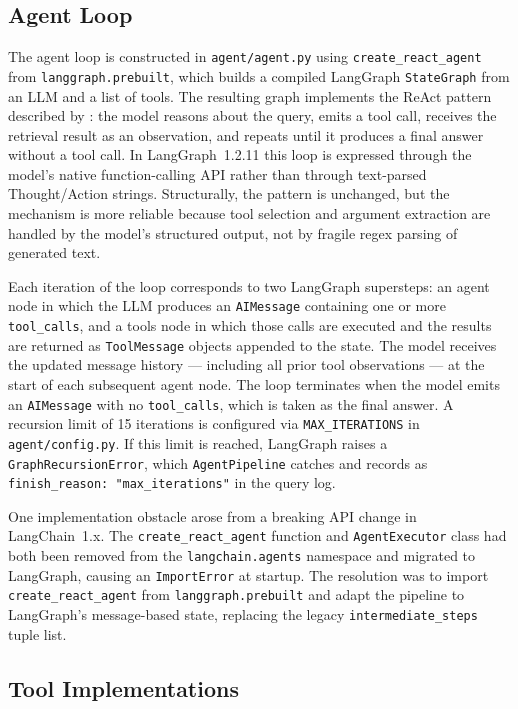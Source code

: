 \subsection{Agent Loop}

The agent loop is constructed in \texttt{agent/agent.py} using \texttt{create\_react\_agent} from \texttt{langgraph.prebuilt}, which builds a compiled LangGraph \texttt{StateGraph} from an LLM and a list of tools. The resulting graph implements the ReAct pattern described by : the model reasons about the query, emits a tool call, receives the retrieval result as an observation, and repeats until it produces a final answer without a tool call. In LangGraph~1.2.11 this loop is expressed through the model's native function-calling API rather than through text-parsed Thought/Action strings. Structurally, the pattern is unchanged, but the mechanism is more reliable because tool selection and argument extraction are handled by the model's structured output, not by fragile regex parsing of generated text.

Each iteration of the loop corresponds to two LangGraph supersteps: an agent node in which the LLM produces an \texttt{AIMessage} containing one or more \texttt{tool\_calls}, and a tools node in which those calls are executed and the results are returned as \texttt{ToolMessage} objects appended to the state. The model receives the updated message history — including all prior tool observations — at the start of each subsequent agent node. The loop terminates when the model emits an \texttt{AIMessage} with no \texttt{tool\_calls}, which is taken as the final answer. A recursion limit of 15 iterations is configured via \texttt{MAX\_ITERATIONS} in \texttt{agent/config.py}. If this limit is reached, LangGraph raises a \texttt{GraphRecursionError}, which \texttt{AgentPipeline} catches and records as \texttt{finish\_reason: "max\_iterations"} in the query log.

One implementation obstacle arose from a breaking API change in LangChain~1.x. The \texttt{create\_react\_agent} function and \texttt{AgentExecutor} class had both been removed from the \texttt{langchain.agents} namespace and migrated to LangGraph, causing an \texttt{ImportError} at startup. The resolution was to import \texttt{create\_react\_agent} from \texttt{langgraph.prebuilt} and adapt the pipeline to LangGraph's message-based state, replacing the legacy \texttt{intermediate\_steps} tuple list.

\subsection{Tool Implementations}

